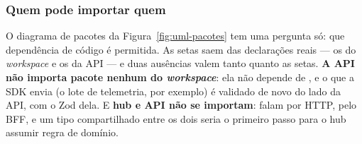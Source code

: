 \subsubsection{Quem pode importar quem}

O diagrama de pacotes da Figura~\ref{fig:uml-pacotes} tem uma pergunta só: que
dependência de código é permitida. As setas saem das declarações reais --- os
 do \emph{workspace} e os  da API --- e duas
ausências valem tanto quanto as setas. \textbf{A API não importa pacote nenhum do
\emph{workspace}}: ela não depende de , e o que a SDK envia (o
lote de telemetria, por exemplo) é validado de novo do lado da API, com o Zod
dela. E
\textbf{hub e API não se importam}: falam por HTTP, pelo BFF, e um tipo
compartilhado entre os dois seria o primeiro passo para o hub assumir regra de
domínio.

